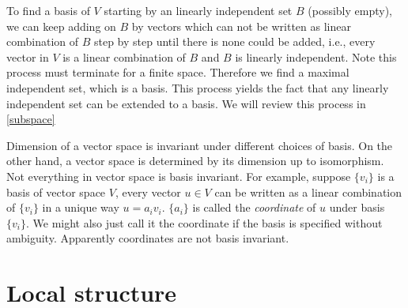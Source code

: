 \documentclass{amsbook}
\theoremstyle{definition}
\theoremstyle{remark}
\numberwithin{section}{chapter}
\numberwithin{equation}{chapter}
\begin{document}
To find a basis of $V$ starting by an linearly independent set $B$ (possibly empty), we can keep adding on $B$ by vectors which can not be written as linear combination of $B$ step by step until there is none could be added, i.e., every vector in $V$ is a linear combination of $B$ and $B$ is linearly independent. Note this process must terminate for a finite space. Therefore we find a maximal independent set, which is a basis. This process yields the fact that any linearly independent set can be extended to a basis. We will review this process in \ref{subspace}

Dimension of a vector space is invariant under different choices of basis. On the other hand, a vector space is determined by its dimension up to isomorphism. Not everything in vector space is basis invariant. For example, suppose $\{v_i\}$ is a basis of vector space $V$, every vector $u\in V$ can be written as a linear combination of $\{v_i\}$ in a unique way $u = a_iv_i$. $\{a_i\}$ is called the \emph{coordinate} of $u$ under basis $\{v_i\}$. We might also just call it the coordinate if the basis is specified without ambiguity. Apparently coordinates are not basis invariant.



\section{Local structure}
\end{document}
